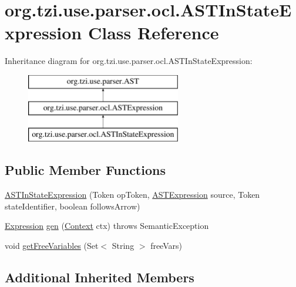 \hypertarget{classorg_1_1tzi_1_1use_1_1parser_1_1ocl_1_1_a_s_t_in_state_expression}{\section{org.\-tzi.\-use.\-parser.\-ocl.\-A\-S\-T\-In\-State\-Expression Class Reference}
\label{classorg_1_1tzi_1_1use_1_1parser_1_1ocl_1_1_a_s_t_in_state_expression}
}
Inheritance diagram for org.\-tzi.\-use.\-parser.\-ocl.\-A\-S\-T\-In\-State\-Expression\-:\begin{figure}[H]
\begin{center}
\leavevmode
\includegraphics[height=3.000000cm]{classorg_1_1tzi_1_1use_1_1parser_1_1ocl_1_1_a_s_t_in_state_expression}
\end{center}
\end{figure}
\subsection*{Public Member Functions}
\begin{DoxyCompactItemize}
\item 
\hyperlink{classorg_1_1tzi_1_1use_1_1parser_1_1ocl_1_1_a_s_t_in_state_expression_a761f8b74d35fd20dbef198369ae268c4}{A\-S\-T\-In\-State\-Expression} (Token op\-Token, \hyperlink{classorg_1_1tzi_1_1use_1_1parser_1_1ocl_1_1_a_s_t_expression}{A\-S\-T\-Expression} source, Token state\-Identifier, boolean follows\-Arrow)
\item 
\hyperlink{classorg_1_1tzi_1_1use_1_1uml_1_1ocl_1_1expr_1_1_expression}{Expression} \hyperlink{classorg_1_1tzi_1_1use_1_1parser_1_1ocl_1_1_a_s_t_in_state_expression_a8246ca52ef909298f55703e4469211f8}{gen} (\hyperlink{classorg_1_1tzi_1_1use_1_1parser_1_1_context}{Context} ctx)  throws Semantic\-Exception 
\item 
void \hyperlink{classorg_1_1tzi_1_1use_1_1parser_1_1ocl_1_1_a_s_t_in_state_expression_afef3391b3672d81d429623fdcc95a643}{get\-Free\-Variables} (Set$<$ String $>$ free\-Vars)
\end{DoxyCompactItemize}
\subsection*{Additional Inherited Members}



